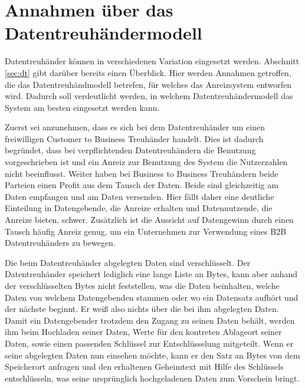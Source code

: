 \documentclass{scrreprt}
\begin{document}
\section{Annahmen über das Datentreuhändermodell}
Datentreuhänder können in verschiedenen Variation eingesetzt werden. Abschnitt \ref{sec:dt} gibt darüber bereits einen Überblick. Hier werden Annahmen getroffen, die das Datentreuhändmodell betrefen, für welches das Anreizsystem entworfen wird. Dadurch soll verdeutlicht werden, in welchem Datentreuhändermodell das System am besten eingesetzt werden kann.

Zuerst sei anzunehmen, dass es sich bei dem Datentreuhänder um einen freiwilligen Customer to Business Treuhänder handelt. Dies ist dadurch begründet, dass bei verpflichtenden Datentreuhändern die Benutzung vorgeschrieben ist und ein Anreiz zur Benutzung des System die Nutzerzahlen nicht beeinflusst. Weiter haben bei Business to Business Treuhändern beide Parteien einen Profit aus dem Tausch der Daten. Beide sind gleichzeitig am Daten empfangen und am Daten versenden. Hier fällt daher eine deutliche Einteilung in Datengebende, die Anreize erhalten und Datennutzende, die Anreize bieten, schwer. Zusätzlich ist die Aussicht auf Datengewinn durch einen Tausch häufig Anreiz genug, um ein Unternehmen zur Verwendung eines B2B Datentreuhänders zu bewegen. 

Die beim Datentreuhänder abgelegten Daten sind verschlüsselt. Der Datentreuhänder speichert lediglich eine lange Liste an Bytes, kann aber anhand der verschlüsselten Bytes nicht feststellen, was die Daten beinhalten, welche Daten von welchem Datengebenden stammen oder wo ein Datensatz aufhört und der nächste beginnt. Er weiß also nichts über die bei ihm abgelegten Daten. Damit ein Datengebender trotzdem den Zugang zu seinen Daten behält, werden ihm beim Hochladen seiner Daten, Werte für den kontreten Ablageort seiner Daten, sowie einen passenden Schlüssel zur Entschlüsselung mitgeteilt. Wenn er seine abgelegten Daten nun einsehen möchte, kann er den Satz an Bytes von dem Speicherort anfragen und den erhaltenen Geheimtext mit Hilfe des Schlüssels entschlüsseln, was seine ursprünglich hochgeladenen Daten zum Vorschein bringt.
\end{document}
